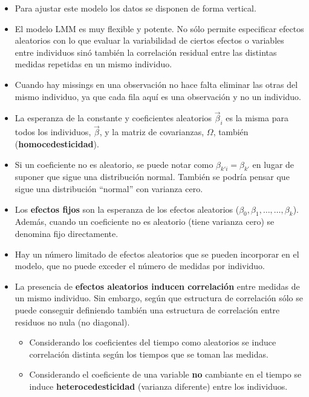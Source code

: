 \documentclass[
]{book}
\begin{document}
\begin{itemize}
\item
  Para ajustar este modelo los datos se disponen de forma vertical.
\item
  El modelo LMM es muy flexible y potente. No sólo permite especificar efectos aleatorios con lo que evaluar la variabilidad de ciertos efectos o variables entre individuos sinó también la correlación residual entre las distintas medidas repetidas en un mismo individuo.
\item
  Cuando hay missings en una observación no hace falta eliminar las otras del mismo individuo, ya que cada fila aquí es una observación y no un individuo.
\item
  La esperanza de la constante y coeficientes aleatorios \(\vec{\beta}_i\) es la misma para todos los individuos, \(\vec{\beta}\), y la matriz de covarianzas, \(\Omega\), también (\textbf{homocedesticidad}).
\item
  Si un coeficiente no es aleatorio, se puede notar como \(\beta_{k'i} = \beta_{k'}\) en lugar de suponer que sigue una distribución normal. También se podría pensar que sigue una distribución ``normal'' con varianza cero.
\item
  Los \textbf{efectos fijos} son la esperanza de los efectos aleatorios (\(\beta_0, \beta_1, \ldots, \ldots, \beta_k\)). Además, cuando un coeficiente no es aleatorio (tiene varianza cero) se denomina fijo directamente.
\item
  Hay un número limitado de efectos aleatorios que se pueden incorporar en el modelo, que no puede exceder el número de medidas por individuo.
\item
  La presencia de \textbf{efectos aleatorios inducen correlación} entre medidas de un mismo individuo. Sin embargo, según que estructura de correlación sólo se puede conseguir definiendo también una estructura de correlación entre residuos no nula (no diagonal).

  \begin{itemize}
  \item
    Considerando los coeficientes del tiempo como aleatorios se induce correlación distinta según los tiempos que se toman las medidas.
  \item
    Considerando el coeficiente de una variable \textbf{no} cambiante en el tiempo se induce \textbf{heterocedesticidad} (varianza diferente) entre los individuos.
  \end{itemize}
\end{itemize}
\end{document}
